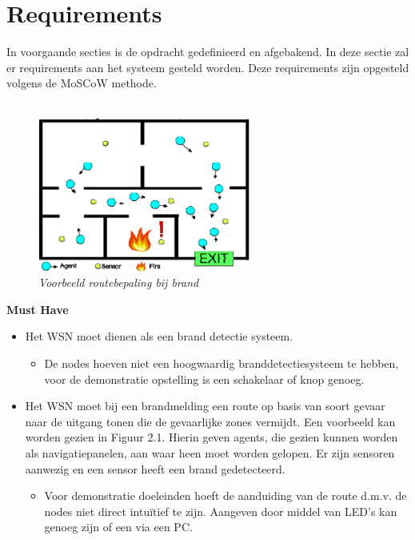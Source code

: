 \documentclass{../local}
\begin{document}
\section{Requirements}
In voorgaande secties is de opdracht gedefinieerd en afgebakend. In deze sectie zal er requirements aan het systeem gesteld worden. Deze requirements zijn opgesteld volgens de MoSCoW methode.
\\\\

\begin{figure}
\includegraphics[width=7cm]{../images/BrandNavigatieVoorbeeld}
\caption{\emph{Voorbeeld routebepaling bij brand\cite{ZengFire}}}
\end{figure}

\noindent\textbf{Must Have}
\begin{itemize}
\item Het WSN moet dienen als een brand detectie systeem.
\begin{itemize}
\item De nodes hoeven niet een hoogwaardig branddetectiesysteem te hebben, voor de demonstratie opstelling is een schakelaar of knop genoeg.
\end{itemize}
\item Het WSN moet bij een brandmelding een route op basis van soort gevaar naar de uitgang tonen die de gevaarlijke zones vermijdt. Een voorbeeld kan worden gezien in Figuur 2.1. Hierin geven agents, die gezien kunnen worden als navigatiepanelen, aan waar heen moet worden gelopen. Er zijn sensoren aanwezig en een sensor heeft een brand gedetecteerd.
\begin{itemize}
\item Voor demonstratie doeleinden hoeft de aanduiding van de route d.m.v. de nodes niet direct intuïtief te zijn. Aangeven door middel van LED's kan genoeg zijn of een via een PC.
\end{itemize}
\end{itemize}
\end{document}
